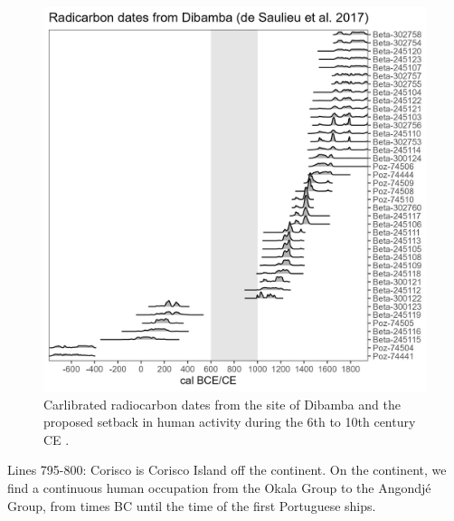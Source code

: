 \begin{reviewer}
\begin{figure}[!tb]
	\includegraphics[width=\textwidth]{fig/varia_c14_dibamba.jpg}
	\caption{Carlibrated radiocarbon dates from the site of Dibamba \citep{Saulieu.2017} and the proposed setback in human activity during the 6th to 10th century CE \citep[grey shading;][]{Seidensticker.2021e}.}
	\label{fig:14c_dibamba}
\end{figure}

\point Lines 795-800: Corisco is Corisco Island off the continent. On the continent, we find a continuous human occupation from the Okala Group to the Angondjé Group, from times BC until the time of the first Portuguese ships.


\end{reviewer}
